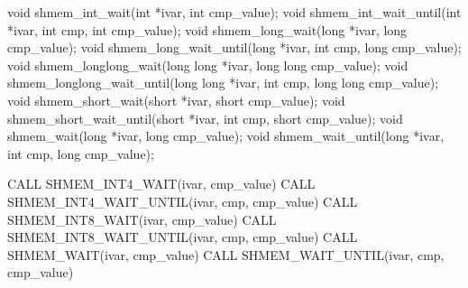 
\begin{apidefinition}

\begin{Csynopsis}
void shmem_int_wait(int *ivar, int cmp_value);
void shmem_int_wait_until(int *ivar, int cmp, int cmp_value);
void shmem_long_wait(long *ivar, long cmp_value);
void shmem_long_wait_until(long *ivar, int cmp, long cmp_value);
void shmem_longlong_wait(long long *ivar, long long cmp_value);
void shmem_longlong_wait_until(long long *ivar, int cmp, long long cmp_value);
void shmem_short_wait(short *ivar, short cmp_value);
void shmem_short_wait_until(short *ivar, int cmp, short cmp_value);
void shmem_wait(long *ivar, long cmp_value);
void shmem_wait_until(long *ivar, int cmp, long cmp_value);
\end{Csynopsis}

\begin{Fsynopsis}
CALL SHMEM_INT4_WAIT(ivar, cmp_value)
CALL SHMEM_INT4_WAIT_UNTIL(ivar, cmp, cmp_value)
CALL SHMEM_INT8_WAIT(ivar, cmp_value)
CALL SHMEM_INT8_WAIT_UNTIL(ivar, cmp, cmp_value)
CALL SHMEM_WAIT(ivar, cmp_value)
CALL SHMEM_WAIT_UNTIL(ivar, cmp, cmp_value)
\end{Fsynopsis}

\begin{apiarguments}


\end{apiarguments}


\end{apidefinition}
